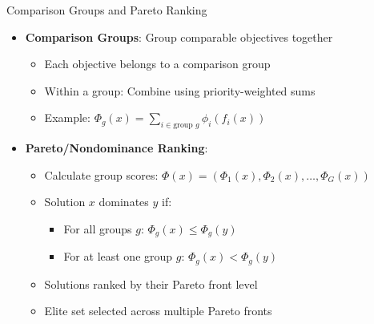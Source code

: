 \documentclass{beamer}
\begin{document}
\begin{frame}{Comparison Groups and Pareto Ranking}
    \begin{itemize}
        \item \textbf{Comparison Groups}: Group comparable objectives together
            \begin{itemize}
                \item Each objective belongs to a comparison group
                \item Within a group: Combine using priority-weighted sums
                \item Example: $\Phi_g(x) = \sum_{i \in \text{group } g} \phi_i(f_i(x))$
            \end{itemize}
        \item \textbf{Pareto/Nondominance Ranking}:
            \begin{itemize}
                \item Calculate group scores: $\Phi(x) = (\Phi_1(x), \Phi_2(x), \ldots, \Phi_G(x))$
                \item Solution $x$ dominates $y$ if:
                    \begin{itemize}
                        \item For all groups $g$: $\Phi_g(x) \leq \Phi_g(y)$
                        \item For at least one group $g$: $\Phi_g(x) < \Phi_g(y)$
                    \end{itemize}
                \item Solutions ranked by their Pareto front level
                \item Elite set selected across multiple Pareto fronts
            \end{itemize}
    \end{itemize}
\end{frame}
\end{document}

